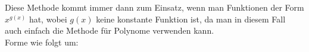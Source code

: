 



Diese Methode kommt immer dann zum Einsatz, wenn man Funktionen der Form $x^{g(x)}$ hat, wobei $g(x)$ keine konstante Funktion ist, da man in diesem Fall auch einfach die Methode für Polynome verwenden kann. \\ 
Forme wie folgt um:

